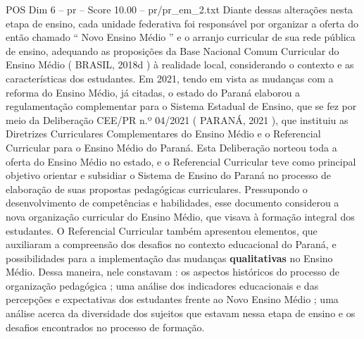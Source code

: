 \begin{textsample}{POS Dim 6 – pr – Score 10.00 – pr/pr\_em\_2.txt}
Diante dessas alterações nesta etapa de ensino, cada unidade federativa foi responsável por organizar a oferta do então chamado “ Novo Ensino Médio ” e o arranjo curricular de sua rede pública de ensino, adequando as proposições da Base Nacional Comum Curricular do Ensino Médio ( BRASIL, 2018d ) à realidade local, considerando o contexto e as características dos estudantes.
Em 2021, tendo em vista as mudanças com a reforma do Ensino Médio, já citadas, o estado do Paraná elaborou a regulamentação complementar para o Sistema Estadual de Ensino, que se fez por meio da Deliberação CEE/PR n.º 04/2021 ( PARANÁ, 2021 ), que instituiu as Diretrizes Curriculares Complementares do Ensino Médio e o Referencial Curricular para o Ensino Médio do Paraná.
Esta Deliberação norteou toda a oferta do Ensino Médio no estado, e o Referencial Curricular teve como principal objetivo orientar e subsidiar o Sistema de Ensino do Paraná no processo de elaboração de suas propostas pedagógicas curriculares.
Pressupondo o desenvolvimento de competências e habilidades, esse documento considerou a nova organização curricular do Ensino Médio, que visava à formação integral dos estudantes.
O Referencial Curricular também apresentou elementos, que auxiliaram a compreensão dos desafios no contexto educacional do Paraná, e possibilidades para a implementação das mudanças \textbf{qualitativas} no Ensino Médio.
Dessa maneira, nele constavam : os aspectos históricos do processo de organização pedagógica ; uma análise dos indicadores educacionais e das percepções e expectativas dos estudantes frente ao Novo Ensino Médio ; uma análise acerca da diversidade dos sujeitos que estavam nessa etapa de ensino e os desafios encontrados no processo de formação.

\end{textsample}
